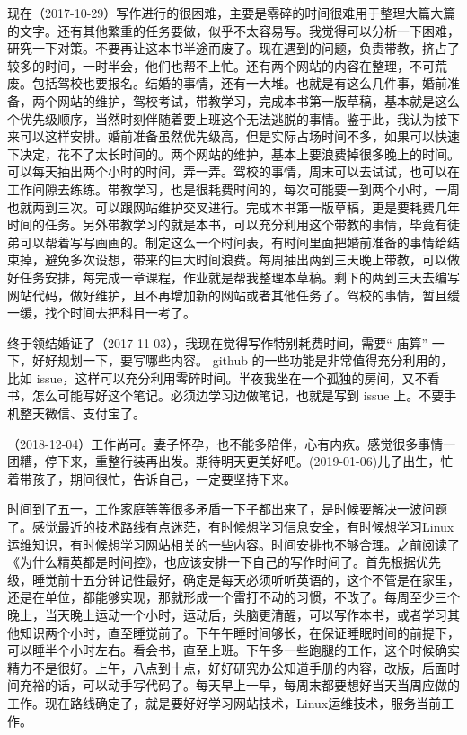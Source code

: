 \documentclass[doctor,openright,twoside]{sjtuthesis}
\theoremstyle{plain}
\theoremstyle{definition}
\theoremstyle{remark}
\theoremstyle{ocrenumbox}
\theoremstyle{plain}
\begin{document}
现在（2017-10-29）写作进行的很困难，主要是零碎的时间很难用于整理大篇大篇的文字。还有其他繁重的任务要做，似乎不太容易写。我觉得可以分析一下困难，研究一下对策。不要再让这本书半途而废了。现在遇到的问题，负责带教，挤占了较多的时间，一时半会，他们也帮不上忙。还有两个网站的内容在整理，不可荒废。包括驾校也要报名。结婚的事情，还有一大堆。也就是有这么几件事，婚前准备，两个网站的维护，驾校考试，带教学习，完成本书第一版草稿，基本就是这么个优先级顺序，当然时刻伴随着要上班这个无法逃脱的事情。鉴于此，我认为接下来可以这样安排。婚前准备虽然优先级高，但是实际占场时间不多，如果可以快速下决定，花不了太长时间的。两个网站的维护，基本上要浪费掉很多晚上的时间。可以每天抽出两个小时的时间，弄一弄。驾校的事情，周末可以去试试，也可以在工作间隙去练练。带教学习，也是很耗费时间的，每次可能要一到两个小时，一周也就两到三次。可以跟网站维护交叉进行。完成本书第一版草稿，更是要耗费几年时间的任务。另外带教学习的就是本书，可以充分利用这个带教的事情，毕竟有徒弟可以帮着写写画画的。制定这么一个时间表，有时间里面把婚前准备的事情给结束掉，避免多次设想，带来的巨大时间浪费。每周抽出两到三天晚上带教，可以做好任务安排，每完成一章课程，作业就是帮我整理本草稿。剩下的两到三天去编写网站代码，做好维护，且不再增加新的网站或者其他任务了。驾校的事情，暂且缓一缓，找个时间去把科目一考了。

终于领结婚证了（2017-11-03），我现在觉得写作特别耗费时间，需要`` 庙算'' 一下，好好规划一下，要写哪些内容。 github 的一些功能是非常值得充分利用的，比如 issue，这样可以充分利用零碎时间。半夜我坐在一个孤独的房间，又不看书，怎么可能写好这个笔记。必须边学习边做笔记，也就是写到 issue 上。不要手机整天微信、支付宝了。

（2018-12-04）工作尚可。妻子怀孕，也不能多陪伴，心有内疚。感觉很多事情一团糟，停下来，重整行装再出发。期待明天更美好吧。(2019-01-06)儿子出生，忙着带孩子，期间很忙，告诉自己，一定要坚持下来。

时间到了五一，工作家庭等等很多矛盾一下子都出来了，是时候要解决一波问题了。感觉最近的技术路线有点迷茫，有时候想学习信息安全，有时候想学习Linux运维知识，有时候想学习网站相关的一些内容。时间安排也不够合理。之前阅读了《为什么精英都是时间控》，也应该安排一下自己的写作时间了。首先根据优先级，睡觉前十五分钟记性最好，确定是每天必须听听英语的，这个不管是在家里，还是在单位，都能够实现，那就形成一个雷打不动的习惯，不改了。每周至少三个晚上，当天晚上运动一个小时，运动后，头脑更清醒，可以写作本书，或者学习其他知识两个小时，直至睡觉前了。下午午睡时间够长，在保证睡眠时间的前提下，可以睡半个小时左右。看会书，直至上班。下午多一些跑腿的工作，这个时候确实精力不是很好。上午，八点到十点，好好研究办公知道手册的内容，改版，后面时间充裕的话，可以动手写代码了。每天早上一早，每周末都要想好当天当周应做的工作。现在路线确定了，就是要好好学习网站技术，Linux运维技术，服务当前工作。
\end{document}
